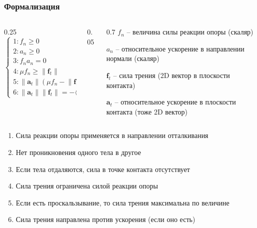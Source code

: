 \documentclass{beamer}
\newcommand{\norm}[1]{\lVert#1\rVert}
\begin{document}
\begin{frame}
\frametitle{Формализация}
    \small
    \begin{columns}
        \begin{column}{0.25\textwidth}
            \[
            \begin{cases}
                1: f_n \ge 0 \\
                2: a_n \ge 0 \\
                3: f_n a_n = 0 \\ 
                4: \mu f_n \ge \norm{\pmb{f}_t} \\
                5: \norm{\pmb{a}_t} (\mu f_n - \norm{\pmb{f}_t}) = 0 \\
                6: \norm{\pmb{a}_t} \norm{\pmb{f}_t} = - \langle \pmb{a}_t, \pmb{f}_t \rangle
            \end{cases}
            \]
        \end{column}

        \begin{column}{0.05\textwidth}
        \end{column}

        \begin{column}{0.7\textwidth}
            $f_n$ -- величина силы реакции опоры (скаляр)
            
            \medskip
            $a_n$ -- относительное ускорение в направлении нормали (скаляр)
            
            \medskip
            $\pmb{f}_t$ -- сила трения (2D вектор в плоскости контакта)
            
            \medskip
            $\pmb{a}_t$ -- относительное ускорение в плоскости контакта (тоже 2D вектор)
        \end{column}
    \end{columns}

    \begin{enumerate}
        \item Сила реакции опоры применяется в направлении отталкивания
        \item Нет проникновения одного тела в другое
        \item Если тела отдаляются, сила в точке контакта отсутствует
        \item Сила трения ограничена силой реакции опоры
        \item Если есть проскальзывание, то сила трения максимальна по величине
        \item Сила трения направлена против ускорения (если оно есть)
    \end{enumerate}
\end{frame}
\end{document}
